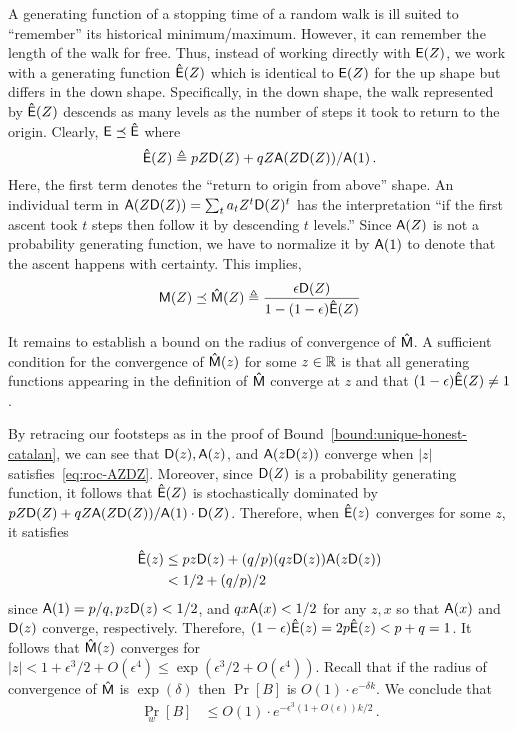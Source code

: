   A generating function of a stopping time of a random walk 
  is ill suited to ``remember'' its historical minimum/maximum. 
  However, it can remember the length of the walk for free. 
  Thus, instead of working directly with $\mathsf{E}(Z)$, 
  we work with a generating function $\mathsf{\hat{E}}(Z)$ 
  which is identical to $\mathsf{E}(Z)$ for the up shape 
  but differs in the down shape. 
  Specifically, in the down shape, 
  the walk represented by $\mathsf{\hat{E}}(Z)$ descends as many levels 
  as the number of steps it took to return to the origin. 
  Clearly, $\mathsf{E} \preceq \mathsf{\hat{E}}$ where 
  \[
      \mathsf{\hat{E}}(Z) \triangleq p Z \mathsf{D}(Z) + q Z \mathsf{A}(Z \mathsf{D}(Z) )/\mathsf{A}(1)
      \,.
  \] 
  Here, the first term denotes the ``return to origin from above'' shape. 
  An individual term in $\mathsf{A}(Z \mathsf{D}(Z)) = \sum_t a_t Z^t \mathsf{D}(Z)^t$ 
  has the interpretation 
  ``if the first ascent took $t$ steps then follow it by descending $t$ levels.''
  Since $\mathsf{A}(Z)$ is not a probability generating function, 
  we have to normalize it by $\mathsf{A}(1)$ to denote that 
  the ascent happens with certainty. 
  This implies, 
  \[
      \mathsf{M}(Z) 
          \preceq \mathsf{\hat{M}}(Z) 
          \triangleq \frac{\epsilon \mathsf{D}(Z)}{1 - (1 - \epsilon) \mathsf{\hat{E}}(Z) }
  \]

  It remains to establish a bound on the radius of convergence of
  $\mathsf{\hat{M}}$. 
  A sufficient condition for the convergence of
  $\mathsf{\hat{M}}(z)$ for some $z \in \mathbb{R}$ is 
  that all generating functions appearing in the definition of
  $\mathsf{\hat{M}}$ converge at $z$ and 
  that $(1-\epsilon) \mathsf{\hat{E}}(Z) \neq 1$. 

  By retracing our footsteps as in the proof of Bound~\ref{bound:unique-honest-catalan}, 
  we can see that $\mathsf{D}(z), \mathsf{A}(z)$, and $\mathsf{A}(z \mathsf{D}(z))$ converge 
  when $|z|$ satisfies~\eqref{eq:roc-AZDZ}. 
  Moreover, since $\mathsf{D}(Z)$ is a probability generating function, 
  it follows that $\mathsf{\hat{E}}(Z)$ is stochastically dominated by 
  $p Z \mathsf{D}(Z) + q Z \mathsf{A}(Z \mathsf{D}(Z) )/\mathsf{A}(1) \cdot \mathsf{D}(Z)$.
  Therefore, when $\mathsf{\hat{E}}(z)$ converges for some $z$, it satisfies 
  \begin{align*}
      \mathsf{\hat{E}}(z)
      &\leq pz\mathsf{D}(z) + (q/p) (q z\mathsf{D}(z))\mathsf{A}(z\mathsf{D}(z)) \\
      &< 1/2 + (q/p)/2
  \end{align*}
  since $\mathsf{A}(1) = p/q, pz\mathsf{D}(z) < 1/2$, 
  and $qx\mathsf{A}(x) < 1/2$ for any $z, x$ so that $\mathsf{A}(x)$ and $\mathsf{D}(z)$ converge, respectively. 
  Therefore, $(1-\epsilon)\mathsf{\hat{E}}(z) = 2p \mathsf{\hat{E}}(z) < p + q = 1$. 
  It follows that 
  $\mathsf{\hat{M}}(z)$ converges for
  $|z| < 1 + \epsilon^3/2 + O(\epsilon^4) \leq \exp(\epsilon^3/2 + O(\epsilon^4))$. 
  Recall that if the radius of convergence of
  $\mathsf{\hat{M}}$ is $\exp(\delta)$ then 
  $\Pr[B]$ is 
  $O(1) \cdot e^{-\delta k}$. 
  We conclude that
  \begin{align}
    \Pr_w[B] 
      &\leq O(1) \cdot e^{-\epsilon^3(1 + O(\epsilon))k/2} \,.
  \label{eq:prob_two_catalan_gf}
  \end{align}


